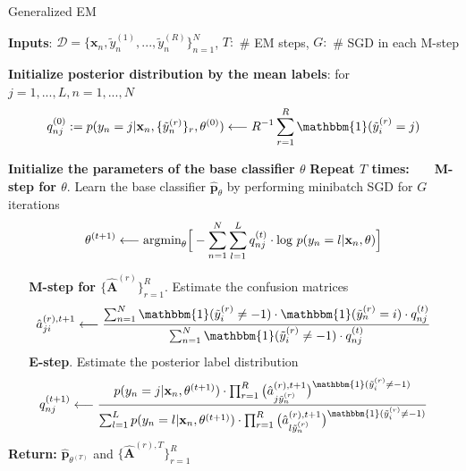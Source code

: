 \begin{algorithm}
	\caption{Generalized EM \cite{raykar2009supervised}}
	\label{alg:generalised_em}
	\footnotesize
	\begin{algorithmic}
		\State \textbf{Inputs}: $\mathcal{D} = \{\textbf{x}_n, \tilde{y}^{(1)}_{n},...,\tilde{y}^{(R)}_{n}\}_{n=1}^{N}$,
		$T:$ \# EM steps, $G:$ \# SGD in each M-step
		
		\State \textbf{Initialize posterior distribution by the mean labels}: for $j=1,..., L, n=1,...,N$
		\vspace{-2mm}
		$$q_{nj} ^{(0)}: = p(y_{n}=j|\textbf{x}_{n}, \{\tilde{y}^{(r)}_{n}\}_r, \theta^{(0)}) \longleftarrow R^{-1}\sum_{r=1}^R \mathbbm{1}(\tilde{y}_{i}^{(r)}=j) $$
		\vspace{-3mm}
		
		\State \textbf{Initialize the parameters of the base classifier $\theta$}
		\State \textbf{Repeat $T$ times:}
		\State $\,\,\,\,\,\,\,\,$ \textbf{M-step for $\theta$}. Learn the base classifier  $\hat{\mathbf{p}}_{\theta}$ by performing minibatch SGD for $G$ iterations 
		\vspace{-2mm}
		$$\theta^{(t+1)} \longleftarrow \text{argmin}_{\theta}\Big{[}-\sum_{n=1}^{N}\sum_{l=1}^{L}q_{nj} ^{(t)}\cdot \text{log } p(y_{n}=l|\mathbf{x}_{n}, \theta) \Big{]}$$ 
		\vspace{-3mm}
		
		\State $\,\,\,\,\,\,\,\,$ \textbf{M-step for $\{\hat{\mathbf{A}}^{(r)}\}_{r=1}^{R}$}. Estimate the confusion matrices 
		\vspace{-2mm}
		$$\hat{a}_{ji}^{(r),t+1} \longleftarrow \frac{\sum_{n=1}^{N}\mathbbm{1}(\tilde{y}_{i}^{(r)} \neq -1)\cdot \mathbbm{1}(\tilde{y}^{(r)}_{n}=i)\cdot q_{nj} ^{(t)}}{\sum_{n=1}^{N} \mathbbm{1}(\tilde{y}_{i}^{(r)} \neq -1)\cdot q_{nj} ^{(t)}}$$ 
		\vspace{-3mm}
		\State $\,\,\,\,\,\,\,\,$  \textbf{E-step}. Estimate the posterior label distribution
		\vspace{-2mm}
		$$q_{nj} ^{(t+1)} \longleftarrow \frac{ p(y_{n}=j|\mathbf{x}_{n}, \theta^{(t+1)})\cdot\prod_{r=1}^{R}\big{(}\hat{a}^{(r),t+1}_{j\tilde{y}^{(r)}_{n}}\big{)}^{\mathbbm{1}(\tilde{y}_{i}^{(r)} \neq -1)}}{\sum_{l=1}^L p(y_{n}=l|\mathbf{x}_{n}, \theta^{(t+1)})\cdot\prod_{r=1}^{R}\big{(}\hat{a}^{(r),t+1}_{l\tilde{y}^{(r)}_{n}}\big{)}^{\mathbbm{1}(\tilde{y}_{i}^{(r)} \neq -1)}}$$
		\vspace{-3mm}
		\State \textbf{Return:   } $\hat{\mathbf{p}}_{\theta^{(T)}}$ and $\{\hat{\mathbf{A}}^{(r),T}\}_{r=1}^R$
	\end{algorithmic}
\end{algorithm}


